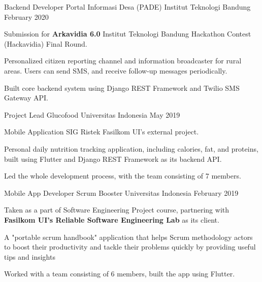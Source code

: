 
\begin{cventries}
  \cventry
    {Backend Developer} %
    {Portal Informasi Desa (PADE)} %
    {Institut Teknologi Bandung} %
    {February 2020} %
    {
      \begin{cvitems} %
        \item Submission for \textbf{Arkavidia 6.0} Institut Teknologi Bandung Hackathon Contest (Hackavidia) Final Round.
		\item Personalized citizen reporting channel and information broadcaster for rural areas. Users can send SMS, and receive follow-up messages periodically.
		\item Built core backend system using Django REST Framework and Twilio SMS Gateway API.
      \end{cvitems}
    }

  \cventry
    {Project Lead} %
    {Glucofood} %
    {Universitas Indonesia} %
    {May 2019} %
    {
      \begin{cvitems} %
      	\item Mobile Application SIG Ristek Fasilkom UI's external project.
		\item Personal daily nutrition tracking application, including calories, fat, and proteins, built using Flutter and Django REST Framework as its backend API.
		\item Led the whole development process, with the team consisting of 7 members.
      \end{cvitems}
    }
    
  \cventry
    {Mobile App Developer} %
    {Scrum Booster} %
    {Universitas Indonesia} %
    {February 2019} %
    {
      \begin{cvitems} %
      	\item Taken as a part of Software Engineering Project course, partnering with \textbf{Fasilkom UI's Reliable Software Engineering Lab} as its client.
		\item A "portable scrum handbook" application that helps Scrum methodology actors to boost their productivity and tackle their problems quickly by providing useful tips and insights 
		\item Worked with a team consisting of 6 members, built the app using Flutter.
      \end{cvitems}
    }
    

\end{cventries}
